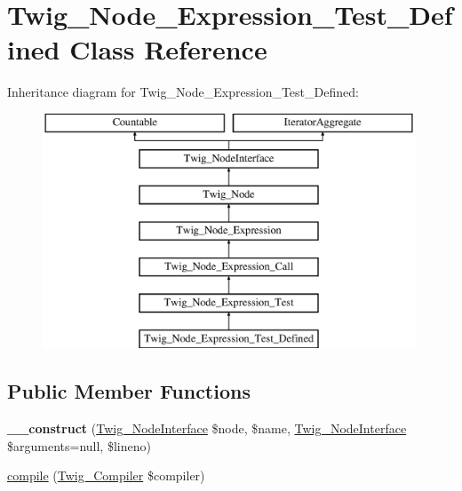 \hypertarget{class_twig___node___expression___test___defined}{}\section{Twig\+\_\+\+Node\+\_\+\+Expression\+\_\+\+Test\+\_\+\+Defined Class Reference}
\label{class_twig___node___expression___test___defined}
Inheritance diagram for Twig\+\_\+\+Node\+\_\+\+Expression\+\_\+\+Test\+\_\+\+Defined\+:\begin{figure}[H]
\begin{center}
\leavevmode
\includegraphics[height=7.000000cm]{class_twig___node___expression___test___defined}
\end{center}
\end{figure}
\subsection*{Public Member Functions}
\begin{DoxyCompactItemize}
\item 
\hypertarget{class_twig___node___expression___test___defined_a341762e0b4ca6e93e6bfd4cc2f7a0b0b}{}{\bfseries \+\_\+\+\_\+construct} (\hyperlink{interface_twig___node_interface}{Twig\+\_\+\+Node\+Interface} \$node, \$name, \hyperlink{interface_twig___node_interface}{Twig\+\_\+\+Node\+Interface} \$arguments=null, \$lineno)\label{class_twig___node___expression___test___defined_a341762e0b4ca6e93e6bfd4cc2f7a0b0b}

\item 
\hyperlink{class_twig___node___expression___test___defined_a4e0faa87c3fae583620b84d3607085da}{compile} (\hyperlink{class_twig___compiler}{Twig\+\_\+\+Compiler} \$compiler)
\end{DoxyCompactItemize}
